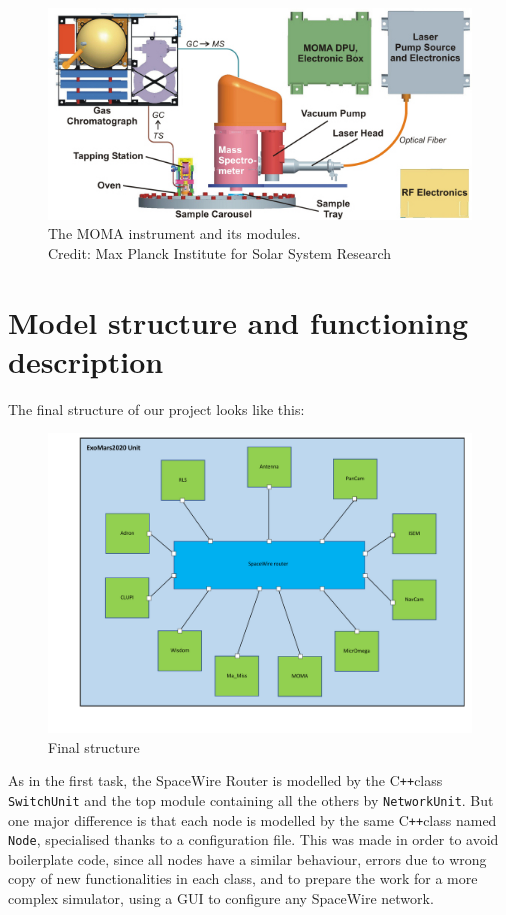 \documentclass[12pt,a4paper]{article}
\newcommand{\Cpp}{C\texttt{++}}
\begin{document}
\begin{figure}[h]
\centering
\includegraphics[scale=.7]{pictures/MOMA.jpg}
\caption{The MOMA instrument and its modules.\\Credit: Max Planck Institute for Solar System Research}
\end{figure}

\pagebreak

\section{Model structure and functioning description}
\smallbreak
The final structure of our project looks like this: \smallbreak
\begin{figure}[h]
\centering
\includegraphics[scale=.5]{pictures/structure_ExoMars2020.pdf}
\caption{Final structure}
\end{figure}
\smallbreak

As in the first task, the SpaceWire Router is modelled by the \Cpp class \texttt{SwitchUnit} and the top module containing all the others by \texttt{NetworkUnit}. But one major difference is that each node is modelled by the same \Cpp class named \texttt{Node}, specialised thanks to a configuration file. This was made in order to avoid boilerplate code, since all nodes have a similar behaviour, errors due to wrong copy of new functionalities in each class, and to prepare the work for a more complex simulator, using a GUI to configure any SpaceWire network.
\end{document}
